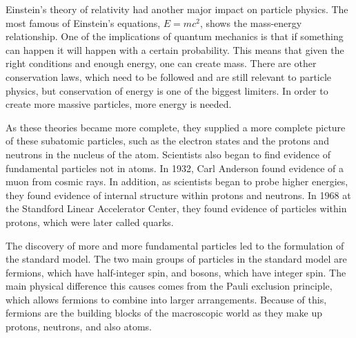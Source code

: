 Einstein's theory of relativity had another major impact on particle physics. The most famous of Einstein's equations, $E = mc^2$, shows the mass-energy relationship. One of the implications of quantum mechanics is that if something can happen it will happen with a certain probability. This means that given the right conditions and enough energy, one can create mass. There are other conservation laws, which need to be followed and are still relevant to particle physics, but conservation of energy is one of the biggest limiters. In order to create more massive particles, more energy is needed. 

As these theories became more complete, they supplied a more complete picture of these subatomic particles, such as the electron states and the protons and neutrons in the nucleus of the atom. Scientists also began to find evidence of fundamental particles not in atoms. In 1932, Carl Anderson found evidence of a muon from cosmic rays. In addition, as scientists began to probe higher energies, they found evidence of internal structure within protons and neutrons. In 1968 at the Standford Linear Accelerator Center, they found evidence of particles within protons, which were later called quarks.

The discovery of more and more fundamental particles led to the formulation of the standard model. The two main groups of particles in the standard model are fermions, which have half-integer spin, and bosons, which have integer spin. The main physical difference this causes comes from the Pauli exclusion principle, which allows fermions to combine into larger arrangements. Because of this, fermions are the building blocks of the macroscopic world as they make up protons, neutrons, and also atoms.   

